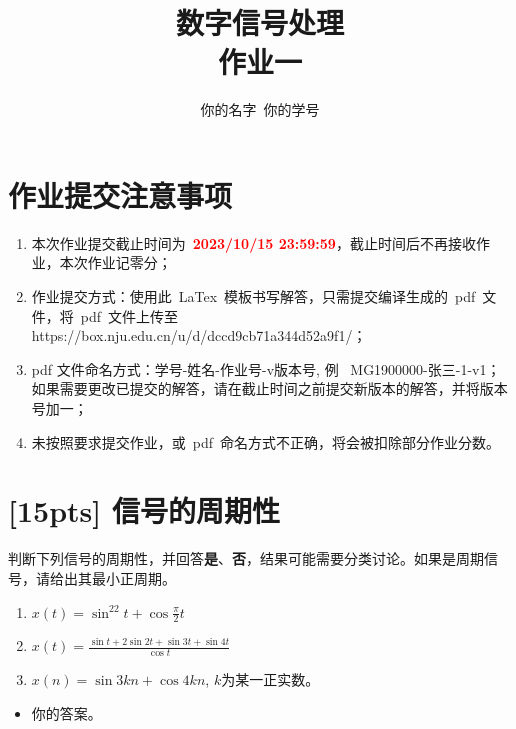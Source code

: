 \documentclass[a4paper,UTF8]{article}
\numberwithin{equation}{section}
\begin{document}
\title{数字信号处理\\
    作业一}
\author{你的名字\, 你的学号}
\maketitle

\section*{作业提交注意事项}
\begin{tcolorbox}
    \begin{enumerate}
        \item[(1)] 本次作业提交截止时间为~\textcolor{red}{\textbf{2023/10/15  23:59:59}}，截止时间后不再接收作业，本次作业记零分；
        \item[(2)] 作业提交方式：使用此~LaTex~模板书写解答，只需提交编译生成的~pdf~文件，将~pdf~文件上传至https://box.nju.edu.cn/u/d/dccd9cb71a344d52a9f1/；
        \item[(3)] pdf 文件命名方式：学号-姓名-作业号-v版本号, 例~ MG1900000-张三-1-v1；如果需要更改已提交的解答，请在截止时间之前提交新版本的解答，并将版本号加一；
        \item[(4)] 未按照要求提交作业，或~pdf~命名方式不正确，将会被扣除部分作业分数。

    \end{enumerate}
\end{tcolorbox}


\newpage
\section{[15pts] 信号的周期性}
判断下列信号的周期性，并回答\textbf{是}、\textbf{否}，结果可能需要分类讨论。如果是周期信号，请给出其最小正周期。
\begin{enumerate}[(1)]
    \item $x(t)=\displaystyle\sin^22t+\cos\frac{\pi}{2} t$
    \item $x(t)=\displaystyle\frac{\sin t + 2\sin2t + \sin3t + \sin 4t}{\cos t}$
    \item $x(n)=\sin 3kn+\cos 4kn$, $k$为某一正实数。
\end{enumerate}

\begin{framed}
    \begin{spacing}{1.5}
        \begin{itemize}
            \item 你的答案。
        \end{itemize}
    \end{spacing}
\end{framed}
\end{document}
